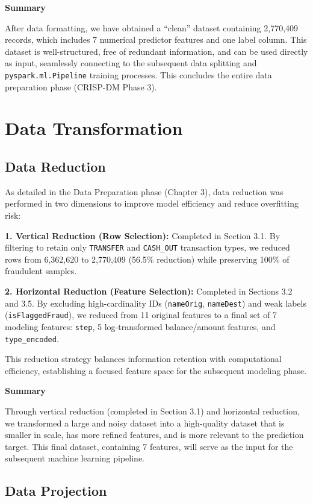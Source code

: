 \documentclass[sigplan,screen]{acmart}
\begin{document}
\textbf{Summary}

After data formatting, we have obtained a ``clean'' dataset containing 2,770,409 records, which includes 7 numerical predictor features and one label column. This dataset is well-structured, free of redundant information, and can be used directly as input, seamlessly connecting to the subsequent data splitting and \texttt{pyspark.ml.Pipeline} training processes. This concludes the entire data preparation phase (CRISP-DM Phase 3).

\section{Data Transformation}

\subsection{Data Reduction}

As detailed in the Data Preparation phase (Chapter 3), data reduction was performed in two dimensions to improve model efficiency and reduce overfitting risk:

\textbf{1. Vertical Reduction (Row Selection):} Completed in Section 3.1. By filtering to retain only \texttt{TRANSFER} and \texttt{CASH\_OUT} transaction types, we reduced rows from 6,362,620 to 2,770,409 (56.5\% reduction) while preserving 100\% of fraudulent samples.

\textbf{2. Horizontal Reduction (Feature Selection):} Completed in Sections 3.2 and 3.5. By excluding high-cardinality IDs (\texttt{nameOrig}, \texttt{nameDest}) and weak labels (\texttt{isFlaggedFraud}), we reduced from 11 original features to a final set of 7 modeling features: \texttt{step}, 5 log-transformed balance/amount features, and \texttt{type\_encoded}.

This reduction strategy balances information retention with computational efficiency, establishing a focused feature space for the subsequent modeling phase.

\textbf{Summary}

Through vertical reduction (completed in Section 3.1) and horizontal reduction, we transformed a large and noisy dataset into a high-quality dataset that is smaller in scale, has more refined features, and is more relevant to the prediction target. This final dataset, containing 7 features, will serve as the input for the subsequent machine learning pipeline.

\subsection{Data Projection}
\end{document}
